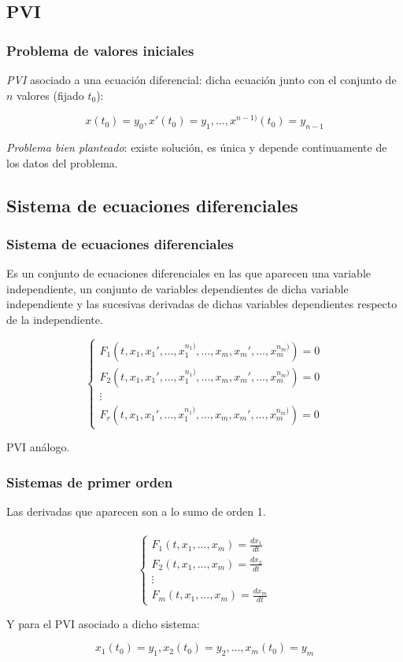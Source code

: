 \documentclass{beamer}
\begin{document}
\subsection{PVI}
\begin{frame}
	\frametitle{Problema de valores iniciales}
	\textit{PVI} asociado a una ecuación diferencial: dicha ecuación junto con el conjunto de $n$ valores (fijado $t_0$):
	
	$$
	x(t_0)=y_0, x'(t_0)=y_1, ...,  x^{n-1)}(t_0)=y_{n-1}
	$$
	
	\textit{Problema bien planteado}: existe solución, es única y depende continuamente de los datos del problema.
	
\end{frame}

\subsection{Sistema de ecuaciones diferenciales}
\begin{frame}
	\frametitle{Sistema de ecuaciones diferenciales}
	
	Es un conjunto de ecuaciones diferenciales en las que aparecen una variable independiente, un conjunto de variables dependientes de dicha variable independiente y las sucesivas derivadas de dichas variables dependientes respecto de la independiente. 
	
	$$
	\begin{cases}
	F_1(t, x_1, x_1', ..., x_1^{n_1)}, ..., x_m, x_m', ..., x_m^{n_m)}) = 0 \\
	F_2(t, x_1, x_1', ..., x_1^{n_1)}, ..., x_m, x_m', ..., x_m^{n_m)}) = 0 \\
	\vdots \\
	F_r(t, x_1, x_1', ..., x_1^{n_1)}, ..., x_m, x_m', ..., x_m^{n_m)}) = 0
	\end{cases}
	$$
	
	PVI análogo.
\end{frame}

\begin{frame}
	\frametitle{Sistemas de primer orden}

	Las derivadas que aparecen son a lo sumo de orden 1.\\~\\
	
	$$
	\begin{cases}
	F_1(t, x_1, ..., x_m) = \frac{d x_1}{d t} \\
	F_2(t, x_1, ..., x_m) = \frac{d x_2}{d t} \\
	\vdots \\
	F_m(t, x_1, ..., x_m) = \frac{d x_m}{d t}
	\end{cases} 
	$$
	
	Y para el PVI asociado a dicho sistema: 
	
	$$ x_1(t_0) = y_1, x_2(t_0) = y_2, ..., x_m(t_0) = y_m $$
\end{frame}
\end{document}
